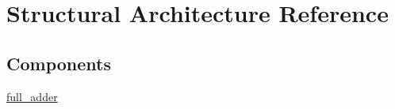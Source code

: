 \hypertarget{classparallel__counter__4_1_1_structural}{\section{Structural Architecture Reference}
\label{classparallel__counter__4_1_1_structural}
}
\subsection*{Components}
 \begin{DoxyCompactItemize}
\item 
\hypertarget{classparallel__counter__4_1_1_structural_gafc1dc8c8d5b91fffc35f2b2eede724ce}{\hyperlink{group___majority_voter_gafc1dc8c8d5b91fffc35f2b2eede724ce}{full\+\_\+adder}  {\bfseries }  }\label{classparallel__counter__4_1_1_structural_gafc1dc8c8d5b91fffc35f2b2eede724ce}

\end{DoxyCompactItemize}
